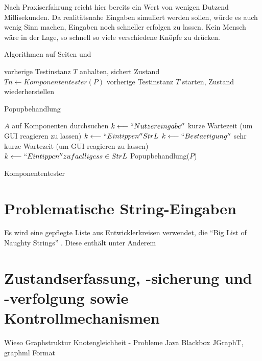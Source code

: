 Nach Praxiserfahrung reicht hier bereits ein Wert von
wenigen Dutzend Millisekunden. Da realitätsnahe
Eingaben simuliert werden sollen, würde es auch wenig Sinn
machen, Eingaben noch schneller erfolgen zu lassen. Kein Mensch
wäre in der Lage, so schnell so viele verschiedene Knöpfe
zu drücken.


Algorithmen auf Seiten \pageref{alg:autotesterpopup} und \pageref{alg:autotestermain}


\begin{algorithm} \SetAlgoLined
	vorherige Testinstanz $T$ anhalten, sichert Zustand\;
	$Tn \longleftarrow Komponententester(P)$\;
	vorherige Testinstanz $T$ starten, Zustand wiederherstellen\;
	\caption{Popupbehandlung}
	\label{alg:autotesterpopup}
\end{algorithm}

\begin{algorithm} \SetAlgoLined
	$A$ auf Komponenten durchsuchen\;
	{
		{
			$k \longleftarrow ``Nutzereingabe''$\;
			kurze Wartezeit (um GUI reagieren zu lassen)
		}
		{
			{
				$k \longleftarrow ``Eintippen'' StrL$\;
				$k \longleftarrow ``Bestaetigung''$\;
				sehr kurze Wartezeit (um GUI reagieren zu lassen)
			}
			$k \longleftarrow ``Eintippen'' zufaelliges s \in StrL$\;
		}
		{
			Popupbehandlung($P$)\;
		}
	}
	\caption{Komponententester}
	\label{alg:autotestermain}
\end{algorithm}


\section{Problematische String-Eingaben}\label{section:naughtystrings}

Es wird eine gepflegte Liste aus Entwicklerkreisen verwendet, die ``Big List of Naughty Strings'' 
\cite{website:naughty-strings}. Diese enthält unter Anderem


\section{Zustandserfassung, -sicherung und -verfolgung sowie Kontrollmechanismen}\label{section:statemonitoring}

Wieso Graphstruktur
Knotengleichheit - Probleme Java Blackbox
JGraphT, graphml Format
